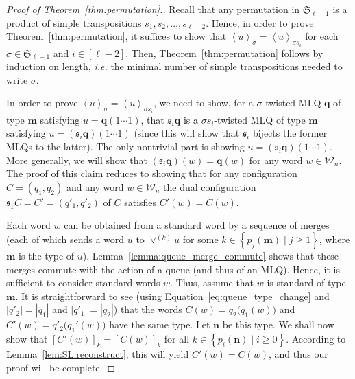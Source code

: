 \documentclass[reqno]{amsart}
\newcommand{\0}{\phantom{c}}
\newcommand{\swt}[1]{\left\langle #1 \right\rangle} %
\newcommand{\SymGp}[1]{\mathfrak{S}_{#1}} %
\newcommand{\mm}{\mathbf{m}}
\newcommand{\nn}{\mathbf{n}}
\newcommand{\qq}{\mathbf{q}}
\newcommand{\mcW}{\mathcal{W}}
\newcommand{\fraks}{\mathfrak{s}}
\newcommand{\set}[1]{\left\{ #1 \right\}}
\newcommand{\abs}[1]{\left| #1 \right|}
\newcommand{\tup}[1]{\left( #1 \right)}
\newcommand{\ive}[1]{\left[ #1 \right]}
\theoremstyle{plain}
\theoremstyle{definition}
\numberwithin{equation}{section}
\begin{document}
\begin{proof}[Proof of Theorem~\ref{thm:permutation}.]
Recall that any permutation in $\SymGp{\ell-1}$ is a product of simple transpositions $s_1, s_2, \ldots, s_{\ell-2}$.
Hence, in order to prove Theorem~\ref{thm:permutation}, it suffices to show that $\swt{u}_{\sigma} = \swt{u}_{\sigma s_i}$ for each $\sigma \in \SymGp{\ell-1}$ and $i \in \ive{\ell-2}$.
Then, Theorem~\ref{thm:permutation} follows by induction on length, \textit{i.e.} the minimal number of simple transpositions needed to write $\sigma$.

In order to prove $\swt{u}_{\sigma} = \swt{u}_{\sigma s_i}$, we need to show, for a $\sigma$-twisted MLQ $\qq$ of type $\mm$ satisfying $u = \qq (1 \dotsm 1)$, that $\fraks_i \qq$ is a $\sigma s_i$-twisted MLQ of type $\mm$ satisfying $u = (\fraks_i \qq) (1 \dotsm 1)$ (since this will show that $\fraks_i$ bijects the former MLQs to the latter).
The only nontrivial part is showing $u = (\fraks_i\qq) (1 \dotsm 1)$.
More generally, we will show that $(\fraks_i\qq)(w) = \qq(w)$ for any word $w \in \mcW_n$.
The proof of this claim reduces to showing that for any configuration $C = \tup{q_1, q_2}$ and any word $w \in \mcW_n$ the dual configuration $\fraks_1 C = C' = (q'_1, q'_2)$ of $C$ satisfies $C'(w) = C(w)$.

Each word $w$ can be obtained from a standard word by a sequence of
merges (each of which sends a word $u$ to $\vee^{(k)} u$ for some
$k \in \set{ p_j(\mm) \mid j \geq 1 }$, where $\mm$ is the type of
$u$). Lemma~\ref{lemma:queue_merge_commute} shows that these merges
commute with the action of a queue (and thus of an MLQ).
Hence, it is sufficient to consider standard words $w$.
Thus, assume that $w$ is standard of type $\mm$.
It is straightforward to see
(using Equation~\eqref{eq:queue_type_change} and $\abs{q'_2} = \abs{q_1}$ and $\abs{q'_1} = \abs{q_2}$)
that the words
$C(w) = q_2\bigl( q_1(w) \bigr)$
and
$C'(w) = q'_2\bigl( q_1'(w) \bigr)$
have the same type.
Let $\nn$ be this type.
We shall now show that
$[C'(w)]_k = [C(w)]_k$
for all $k \in \set{ p_i(\nn) \mid i \geq 0}$.
According to Lemma~\ref{lem:SL.reconstruct}, this will yield $C'(w) = C(w)$, and thus our proof will be complete.


\end{proof}
\end{document}
